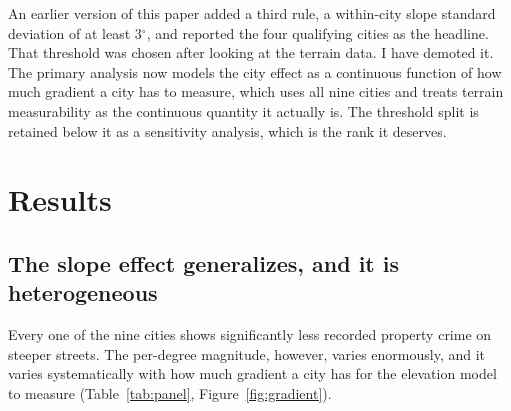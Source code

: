 \documentclass[11pt,letterpaper]{article}
\begin{document}
An earlier version of this paper added a third rule, a within-city slope standard
deviation of at least 3$^\circ$, and reported the four qualifying cities as the
headline. That threshold was chosen after looking at the terrain data. I have
demoted it. The primary analysis now models the city effect as a continuous
function of how much gradient a city has to measure, which uses all nine cities and
treats terrain measurability as the continuous quantity it actually is. The
threshold split is retained below it as a sensitivity analysis, which is the rank
it deserves.

\section{Results}

\subsection{The slope effect generalizes, and it is heterogeneous}

Every one of the nine cities shows significantly less recorded property crime on
steeper streets. The per-degree magnitude, however, varies enormously, and it varies
systematically with how much gradient a city has for the elevation model to measure
(Table~\ref{tab:panel}, Figure~\ref{fig:gradient}).
\end{document}

